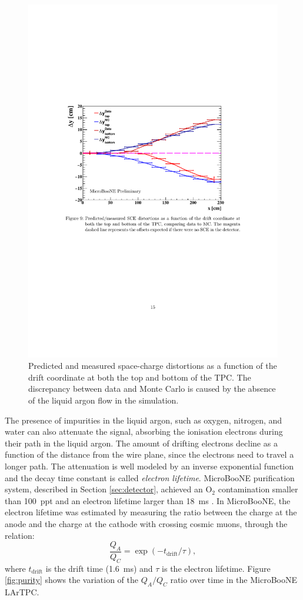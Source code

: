 \begin{figure}[htbp]
    \centering
    \includegraphics[width=0.8\linewidth]{figures/spacecharge.pdf}
    \caption{Predicted and measured space-charge distortions as a function of the drift coordinate at both the top and bottom of the TPC. The discrepancy between data and Monte Carlo is caused by the absence of the liquid argon flow in the simulation.}
    \label{fig:spacecharge}
\end{figure}

The presence of impurities in the liquid argon, such as oxygen, nitrogen, and water can also attenuate the signal, absorbing the ionisation electrons during their path in the liquid argon. The amount of drifting electrons decline as a function of the distance from the wire plane, since the electrons need to travel a longer path. The attenuation is well modeled by an inverse exponential function and the decay time constant is called \emph{electron lifetime}. MicroBooNE purification system, described in Section \ref{sec:detector}, achieved an O$_2$ contamination smaller than 100~ppt and an electron lifetime larger than 18~ms \cite{Meddage:2017lxo}. In MicroBooNE, the electron lifetime was estimated by measuring the ratio between the charge at the anode and the charge at the cathode with crossing cosmic muons, through the relation:
\begin{equation}
    \frac{Q_A}{Q_C} = \exp(-t_{\mathrm{drift}}/\tau),
\end{equation}
where $t_\mathrm{drift}$ is the drift time (1.6~ms) and $\tau$ is the electron lifetime. Figure \ref{fig:purity} shows the variation of the $Q_A/Q_C$ ratio over time in the MicroBooNE LArTPC.


